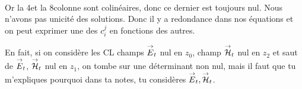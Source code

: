 {\begin{itshape}
\begin{align*}
  \end{align*}

  Or la 4\ieme et la 8\ieme colonne sont colinéaires, donc ce dernier est toujours nul. Nous n'avons pas unicité des solutions. Donc il y a redondance dans nos équations et on peut exprimer une des \(c_i^j\) en fonctions des autres.

  En fait, si on considère les CL champs \({\overset{\rightarrow}{E}}_t\) nul en \(z_0\), champ \({\overset{\rightarrow}{\mathcal{H}}}_t\) nul en \(z_2\) et saut de \({\overset{\rightarrow}{E}}_t\), \({\overset{\rightarrow}{\mathcal{H}}}_t\) nul en \(z_1\), on tombe sur une déterminant non nul, mais il faut que tu m'expliques pourquoi dans ta notes, tu considères \({\overset{\rightarrow}{E}}_t, {\overset{\rightarrow}{\mathcal{H}}}_t\).


\end{itshape}}
